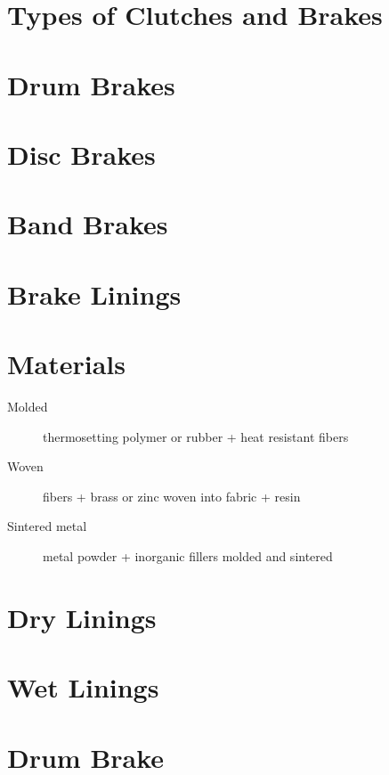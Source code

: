 \documentclass[a4paper,openany]{tufte-book}
\begin{document}
\section{Types of Clutches and Brakes}
\label{sec:orge7e23d6}
\section{Drum Brakes}
\label{sec:orgb9d6567}


\section{Disc Brakes}
\label{sec:org38dc574}


\section{Band Brakes}
\label{sec:org53b02db}


\section{Brake Linings}
\label{sec:org94ca8e7}
\section{Materials}
\label{sec:org2ab80f2}
\begin{description}
\item[{Molded}] thermosetting polymer or rubber + heat resistant fibers

\item[{Woven}] fibers + brass or zinc woven into fabric + resin

\item[{Sintered metal}] metal powder + inorganic fillers molded and sintered
\end{description}

\section{Dry Linings}
\label{sec:org68a7933}


\section{Wet Linings}
\label{sec:org3c332a4}


\section{Drum Brake}
\label{sec:org4db67d8}
\end{document}
